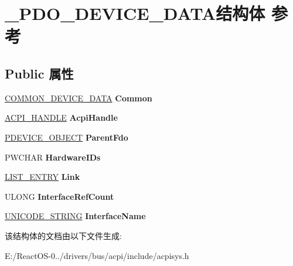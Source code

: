 \hypertarget{struct___p_d_o___d_e_v_i_c_e___d_a_t_a}{}\section{\+\_\+\+P\+D\+O\+\_\+\+D\+E\+V\+I\+C\+E\+\_\+\+D\+A\+T\+A结构体 参考}
\label{struct___p_d_o___d_e_v_i_c_e___d_a_t_a}
\subsection*{Public 属性}
\begin{DoxyCompactItemize}
\item 
\mbox{\label{struct___p_d_o___d_e_v_i_c_e___d_a_t_a_ac60bb11d0f379f149e34a6958a428ae5}} 
\hyperlink{struct___c_o_m_m_o_n___d_e_v_i_c_e___d_a_t_a}{C\+O\+M\+M\+O\+N\+\_\+\+D\+E\+V\+I\+C\+E\+\_\+\+D\+A\+TA} {\bfseries Common}
\item 
\mbox{\label{struct___p_d_o___d_e_v_i_c_e___d_a_t_a_a8ba0d3e5822614958b9d07e78c5871c0}} 
\hyperlink{interfacevoid}{A\+C\+P\+I\+\_\+\+H\+A\+N\+D\+LE} {\bfseries Acpi\+Handle}
\item 
\mbox{\label{struct___p_d_o___d_e_v_i_c_e___d_a_t_a_a7bd797ac805eee3731f3057c92905c2c}} 
\hyperlink{struct___d_e_v_i_c_e___o_b_j_e_c_t}{P\+D\+E\+V\+I\+C\+E\+\_\+\+O\+B\+J\+E\+CT} {\bfseries Parent\+Fdo}
\item 
\mbox{\label{struct___p_d_o___d_e_v_i_c_e___d_a_t_a_a383f83bbeb34349aff5356c7cf79e15e}} 
P\+W\+C\+H\+AR {\bfseries Hardware\+I\+Ds}
\item 
\mbox{\label{struct___p_d_o___d_e_v_i_c_e___d_a_t_a_aa3ba94fe070d92e701f86c2285561e87}} 
\hyperlink{struct___l_i_s_t___e_n_t_r_y}{L\+I\+S\+T\+\_\+\+E\+N\+T\+RY} {\bfseries Link}
\item 
\mbox{\label{struct___p_d_o___d_e_v_i_c_e___d_a_t_a_a97551ac89466ef7941e800faad029ae9}} 
U\+L\+O\+NG {\bfseries Interface\+Ref\+Count}
\item 
\mbox{\label{struct___p_d_o___d_e_v_i_c_e___d_a_t_a_a55fd32d5f21c5fb8fd270fc1d66b9026}} 
\hyperlink{struct___u_n_i_c_o_d_e___s_t_r_i_n_g}{U\+N\+I\+C\+O\+D\+E\+\_\+\+S\+T\+R\+I\+NG} {\bfseries Interface\+Name}
\end{DoxyCompactItemize}


该结构体的文档由以下文件生成\+:\begin{DoxyCompactItemize}
\item 
E\+:/\+React\+O\+S-\/0../drivers/bus/acpi/include/acpisys.\+h\end{DoxyCompactItemize}
